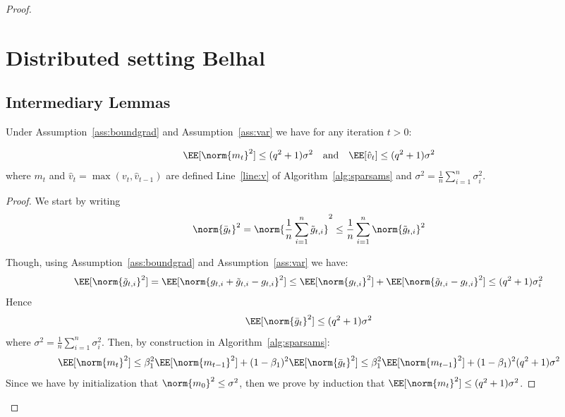 \documentclass[11pt]{article}
\begin{document}
\begin{proof}
\clearpage


\section{Distributed setting Belhal}



\subsection{Intermediary Lemmas}

\begin{Lemma}\label{lem:bound}
Under Assumption~\ref{ass:boundgrad} and Assumption~\ref{ass:var} we have for any iteration $t >0$:

\begin{equation}
\EE[\norm{m_t}^2] \leq (q^2+1) \sigma^2 \quad \textrm{and} \quad \EE[\hat v_t] \leq (q^2+1) \sigma^2
\end{equation}
where $m_t$ and $\hat v_t=\max(v_t,\hat v_{t-1})$ are defined Line~\ref{line:v} of Algorithm~\ref{alg:sparsams} and $\sigma^2 = \frac{1}{n}\sum_{i=1}^n  \sigma_i^2$.
\end{Lemma}

\begin{proof}
We start by writing
\begin{equation}
\norm{\bar g_t}^2  = \norm{\frac{1}{n}\sum_{i=1}^n \tilde g_{t,i} }^2 \leq \frac{1}{n}\sum_{i=1}^n \norm{\tilde g_{t,i} }^2
\end{equation}

Though, using Assumption~\ref{ass:boundgrad} and Assumption~\ref{ass:var} we have:
\begin{equation}
\EE[\norm{\tilde g_{t,i} }^2]  = \EE[\norm{g_{t,i}  + \tilde g_{t,i}  - g_{t,i}}^2] \leq \EE[\norm{g_{t,i} }^2] + \EE[\norm{\tilde g_{t,i}  - g_{t,i}}^2] \leq (q^2+1)\sigma_i^2
\end{equation}
Hence
\begin{equation}
\EE[\norm{\bar g_t}^2]  \leq (q^2+1) \sigma^2
\end{equation}
where $\sigma^2 = \frac{1}{n}\sum_{i=1}^n  \sigma_{i}^2$.
Then, by construction in Algorithm~\ref{alg:sparsams}:
\begin{equation}
\EE[\norm{m_t}^2]  \leq \beta_1^2 \EE[\norm{m_{t-1}}^2] + (1 - \beta_1)^2 \EE[\norm{\bar g_t}^2]  \leq \beta_1^2\EE[ \norm{m_{t-1}}^2] + (1 - \beta_1)^2(q^2+1) \sigma^2
\end{equation}
Since we have by initialization that $\norm{m_0}^2 \leq \sigma^2$, then we prove by induction that $\EE[\norm{m_t}^2] \leq (q^2+1) \sigma^2$.


\end{proof}
\end{proof}
\end{document}
